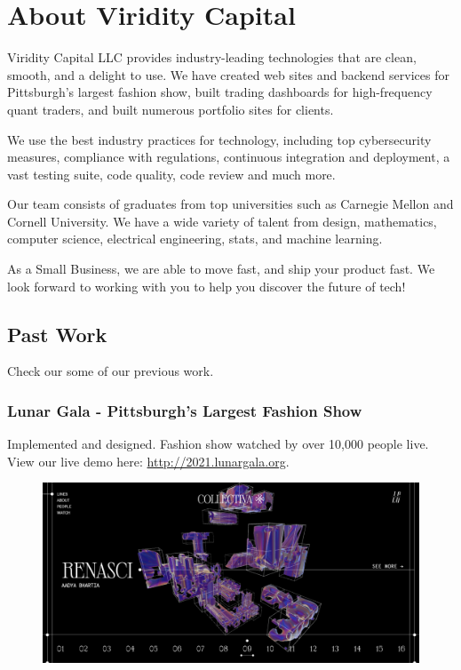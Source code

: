 
\section{About Viridity Capital}

Viridity Capital LLC provides industry-leading technologies that are clean,
smooth, and a delight to use. We have created web sites and backend services
for Pittsburgh's largest fashion show, built trading dashboards for
high-frequency quant traders, and built numerous portfolio sites for clients.

We use the best industry practices for technology, including top cybersecurity
measures, compliance with regulations, continuous integration and deployment, a
vast testing suite, code quality, code review and much more.

Our team consists of graduates from top universities such as Carnegie Mellon
and Cornell University. We have a wide variety of talent from design,
mathematics, computer science, electrical engineering, stats, and machine
learning.

As a Small Business, we are able to move fast, and ship your product fast. We
look forward to working with you to help you discover the future of tech!

\subsection{Past Work}

Check our some of our previous work.

\subsubsection{Lunar Gala - Pittsburgh's Largest Fashion Show}

Implemented and designed. Fashion show watched by over 10,000 people live. 
View our live demo here: \href{http://2021.lunargala.org/}{http://2021.lunargala.org}. \vspace{12pt}

\begin{figure}[H]
  \centering
  \includegraphics[width=\textwidth]{lunargala.jpg}
\end{figure}

